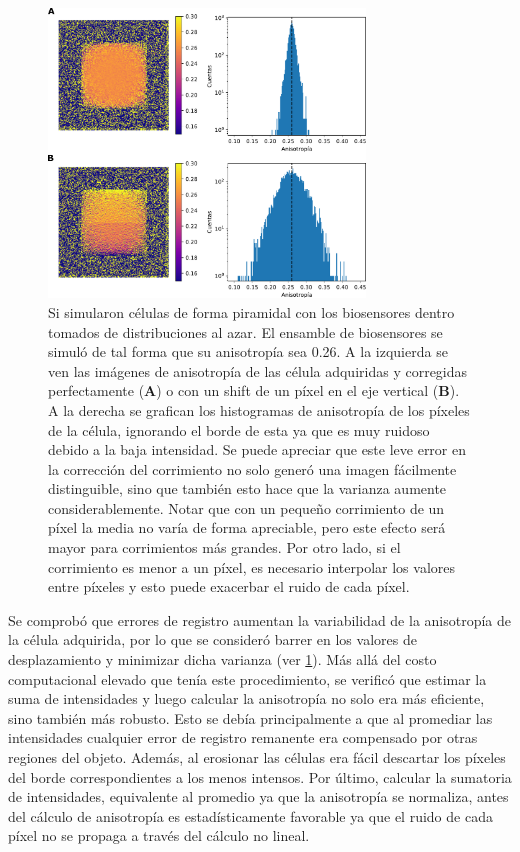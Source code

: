 \begin{figure}[t!]
    \centering
    \includegraphics[width=0.75\textwidth]{img/cap_2/anisotropy_variances.pdf}
    \caption{\footnotesize{Si simularon células de forma piramidal con los biosensores dentro tomados de distribuciones al azar. El ensamble de biosensores se simuló de tal forma que su anisotropía sea 0.26. A la izquierda se ven las imágenes de anisotropía de las célula adquiridas y corregidas perfectamente (\textbf{A}) o con un shift de un píxel en el eje vertical (\textbf{B}). A la derecha se grafican los histogramas de anisotropía de los píxeles de la célula, ignorando el borde de esta ya que es muy ruidoso debido a la baja intensidad. Se puede apreciar que este leve error en la corrección del corrimiento no solo generó una imagen fácilmente distinguible, sino que también esto hace que la varianza aumente considerablemente. Notar que con un pequeño corrimiento de un píxel la media no varía de forma apreciable, pero este efecto será mayor para corrimientos más grandes. Por otro lado, si el corrimiento es menor a un píxel, es necesario interpolar los valores entre píxeles y esto puede exacerbar el ruido de cada píxel.}}
    \label{fig:anisotropy_variance}
\end{figure}

Se comprobó que errores de registro aumentan la variabilidad de la anisotropía de la célula adquirida, por lo que se consideró barrer en los valores de desplazamiento y minimizar dicha varianza (ver \cref{fig:anisotropy_variance}). Más allá del costo computacional elevado que tenía este procedimiento, se verificó que estimar la suma de intensidades y luego calcular la anisotropía no solo era más eficiente, sino también más robusto. Esto se debía principalmente a que al promediar las intensidades cualquier error de registro remanente era compensado por otras regiones del objeto. Además, al erosionar las células era fácil descartar los píxeles del borde correspondientes a los menos intensos. Por último, calcular la sumatoria de intensidades, equivalente al promedio ya que la anisotropía se normaliza, antes del cálculo de anisotropía es estadísticamente favorable ya que el ruido de cada píxel no se propaga a través del cálculo no lineal.


